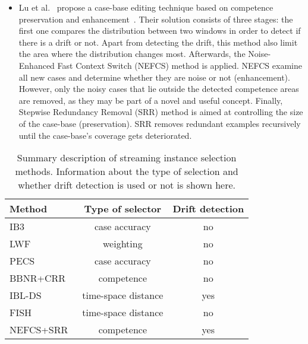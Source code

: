 \documentclass[preprint,12pt]{elsarticle}
\begin{document}
\begin{itemize}
	\item Lu et al.~\cite{lu16} propose a case-base editing technique based on competence preservation and enhancement~\cite{smyth95}. Their solution consists of three stages: the first one compares the distribution between two windows in order to detect if there is a drift or not. Apart from detecting the drift, this method also limit the area where the distribution changes most. Afterwards, the Noise-Enhanced Fast Context Switch (NEFCS) method is applied. NEFCS examine all new cases and determine whether they are noise or not (enhancement). However, only the noisy cases that lie outside the detected competence areas are removed, as they may be part of a novel and useful concept. Finally, Stepwise Redundancy Removal (SRR) method is aimed at controlling the size of the case-base (preservation). SRR removes redundant examples recursively until the case-base's coverage gets deteriorated.

\end{itemize}


\begin{table}[!htp]
\renewcommand{\arraystretch}{1.3}
\centering
\scriptsize
\caption{Summary description of streaming instance selection methods. Information about the type of selection and whether drift detection is used or not is shown here.}
\label{tab:fs}
\begin{tabular}{ lcc }
\toprule
{\bf Method} & {\bf Type of selector} & {\bf Drift detection}\\
\midrule
IB3~\cite{aha91} & case accuracy & no\\
LWF~\cite{salga93} & weighting & no\\
PECS~\cite{salga97} & case accuracy & no\\
BBNR+CRR~\cite{masud10} & competence & no\\
IBL-DS~\cite{berin07} & time-space distance & yes\\
FISH~\cite{gomes14} & time-space distance & no\\
NEFCS+SRR~\cite{lu16} & competence & yes\\
\bottomrule
\end{tabular}
\end{table}
\end{document}
